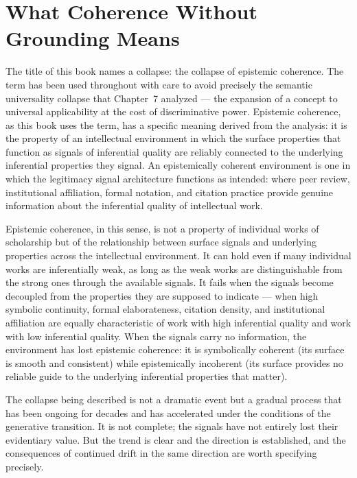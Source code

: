 \documentclass[12pt, openright, twoside]{book}
\begin{document}
\section{What Coherence Without Grounding Means}

The title of this book names a collapse: the collapse of epistemic
coherence. The term has been used throughout with care to avoid precisely
the semantic universality collapse that Chapter~7 analyzed --- the
expansion of a concept to universal applicability at the cost of
discriminative power. Epistemic coherence, as this book uses the term,
has a specific meaning derived from the analysis: it is the property
of an intellectual environment in which the surface properties that
function as signals of inferential quality are reliably connected to
the underlying inferential properties they signal. An epistemically
coherent environment is one in which the legitimacy signal architecture
functions as intended: where peer review, institutional affiliation,
formal notation, and citation practice provide genuine information about
the inferential quality of intellectual work.

Epistemic coherence, in this sense, is not a property of individual
works of scholarship but of the relationship between surface signals
and underlying properties across the intellectual environment. It can
hold even if many individual works are inferentially weak, as long as
the weak works are distinguishable from the strong ones through the
available signals. It fails when the signals become decoupled from the
properties they are supposed to indicate --- when high symbolic continuity,
formal elaborateness, citation density, and institutional affiliation
are equally characteristic of work with high inferential quality and
work with low inferential quality. When the signals carry no information,
the environment has lost epistemic coherence: it is symbolically coherent
(its surface is smooth and consistent) while epistemically incoherent
(its surface provides no reliable guide to the underlying inferential
properties that matter).

The collapse being described is not a dramatic event but a gradual
process that has been ongoing for decades and has accelerated under
the conditions of the generative transition. It is not complete; the
signals have not entirely lost their evidentiary value. But the trend
is clear and the direction is established, and the consequences of
continued drift in the same direction are worth specifying precisely.
\end{document}

